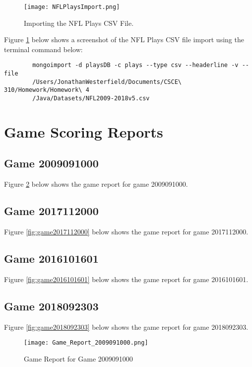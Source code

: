 \documentclass [a4paper,12pt] {article}
\begin{document}
    \begin{figure}
        \texttt{[image: NFLPlaysImport.png]}
        \caption{Importing the NFL Plays CSV File.}
        \label{fig:import1}
    \end{figure} 

    Figure \ref{fig:import1} below shows a screenshot of the NFL Plays CSV file import
    using the terminal command below:

    \begin{verbatim}
        mongoimport -d playsDB -c plays --type csv --headerline -v --file 
        /Users/JonathanWesterfield/Documents/CSCE\ 310/Homework/Homework\ 4
        /Java/Datasets/NFL2009-2018v5.csv
    \end{verbatim}

\section{Game Scoring Reports}
    \subsection{Game 2009091000}
        Figure \ref{fig:game2009091000} below shows the game report for game 2009091000.

    \subsection{Game 2017112000}
        Figure \ref{fig:game2017112000} below shows the game report for game 2017112000.

    \subsection{Game 2016101601}
        Figure \ref{fig:game2016101601} below shows the game report for game 2016101601.
    
    \subsection{Game 2018092303}
        Figure \ref{fig:game2018092303} below shows the game report for game 2018092303.

    \begin{figure}[H]
        \texttt{[image: Game\_Report\_2009091000.png]}
        \caption{Game Report for Game 2009091000}
        \label{fig:game2009091000}
    \end{figure} 
\end{document}
